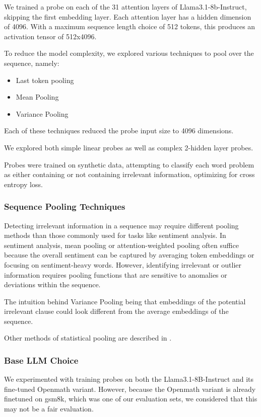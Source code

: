 \documentclass{article}
\begin{document}
We trained a probe on each of the 31 attention layers of Llama3.1-8b-Instruct, skipping the first embedding layer. Each attention layer has a hidden dimension of 4096. With a maximum sequence length choice of 512 tokens, this produces an activation tensor of 512x4096.

To reduce the model complexity, we explored various techniques to pool over the sequence, namely:

\begin{itemize}
    \item Last token pooling
    \item Mean Pooling
    \item Variance Pooling 
\end{itemize}

Each of these techniques reduced the probe input size to 4096 dimensions. 

We explored both simple linear probes as well as complex 2-hidden layer probes. 

Probes were trained on synthetic data, attempting to classify each word problem as either containing or not containing irrelevant information, optimizing for cross entropy loss. 

\subsubsection{Sequence Pooling Techniques}

Detecting irrelevant information in a sequence may require different pooling methods than those commonly used for tasks like sentiment analysis. In sentiment analysis, mean pooling or attention-weighted pooling often suffice because the overall sentiment can be captured by averaging token embeddings or focusing on sentiment-heavy words. However, identifying irrelevant or outlier information requires pooling functions that are sensitive to anomalies or deviations within the sequence.

The intuition behind Variance Pooling being that embeddings of the potential irrelevant clause could look different from the average embeddings of the sequence. 

Other methods of statistical pooling are described in \cite{Zamanzadeh_Darban_2024}.

\subsubsection{Base LLM Choice}
We experimented with training probes on both the Llama3.1-8B-Instruct and its fine-tuned Openmath variant. However, because the Openmath variant is already finetuned on gsm8k, which was one of our evaluation sets, we considered that this may not be a fair evaluation.  
\end{document}
